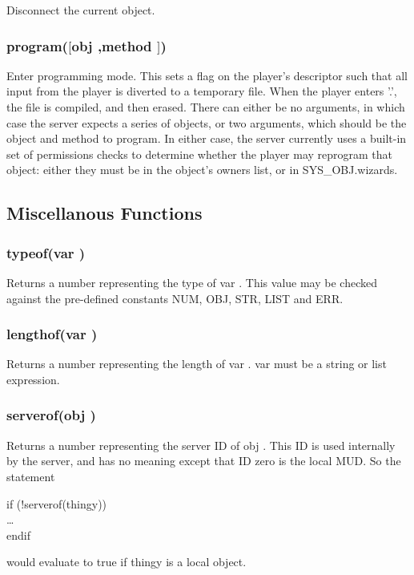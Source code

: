 Disconnect the current object.

\subsubsection{\func program($[${\funcarg obj },{\funcarg method } $]$)}

Enter programming mode.  This sets a flag on the player's descriptor
such that all input from the player is diverted to a temporary file.
When the player enters '.', the file is compiled, and then erased.
There can either be no arguments, in which case the server expects
a series of objects, or two arguments, which should be the object
and method to program.  In either case, the server currently
uses a built-in set of permissions checks to determine whether the
player may reprogram that object: either they must be in the object's
owners list, or in SYS\_OBJ.wizards.

\subsection{Miscellanous Functions}

\subsubsection{\func typeof({\funcarg var })}

Returns a number representing the type of {\funcarg var }.  This value
may be checked against the pre-defined constants NUM, OBJ, STR, LIST
and ERR.

\subsubsection{\func lengthof({\funcarg var })}

Returns a number representing the length of {\funcarg var }. 
{\funcarg var } must be a string or list expression.

\subsubsection{\func serverof({\funcarg obj })}

Returns a number representing the server ID of {\funcarg obj }.  This ID is used
internally by the server, and has no meaning except that ID zero is
the local MUD.  So the statement
\begin{code}
if (!serverof(thingy)) \\
\ind \ldots \\
endif
\end{code}
would evaluate to true if thingy is a local object.

